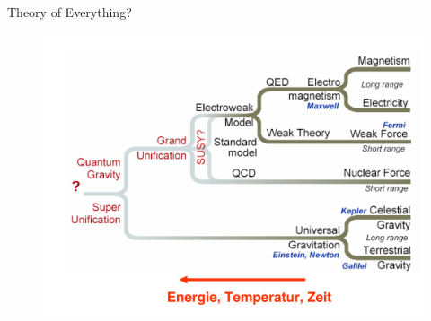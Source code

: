 \documentclass[aspectratio=169,xcolor=dvipsnames]{beamer}
\begin{document}
\begin{frame}{Theory of Everything?}
    \begin{figure}
        \centering
        \includegraphics[width=0.65\linewidth]{figures/toe.png}
        \label{fig:toe}
    \end{figure}
\end{frame}
\end{document}
